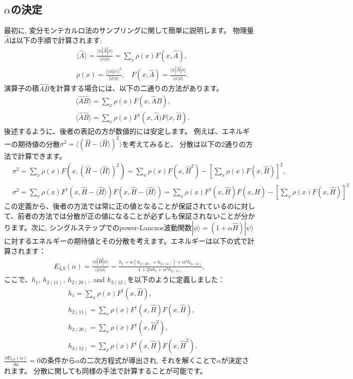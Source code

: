 \subsection{$\alpha$の決定}
最初に, 変分モンテカルロ法のサンプリングに関して簡単に説明します。
物理量$\hat{A}$は以下の手順で計算されます:
\begin{align}
&\langle \hat{A}\rangle = \frac{\langle \phi| \hat{A}|\phi \rangle}{\langle \phi| \phi \rangle} = \sum_{x} \rho(x) F(x, {\hat{A}}),\\
& \rho(x)=\frac{|\langle \phi|x\rangle|^2}{\langle \phi | \phi \rangle}, ~~~~F(x,  {\hat{A}}) =  \frac{\langle x| \hat{A}|\phi \rangle}{\langle x| \phi \rangle}.
\end{align}
演算子の積$\hat{A}\hat{B}$を計算する場合には、以下の二通りの方法があります。
\begin{align}
&\langle \hat{A} \hat{B}\rangle = \sum_{x} \rho(x) F(x, {\hat{A}\hat{B}}),\\
&\langle \hat{A} \hat{B}\rangle = \sum_{x} \rho(x) F^{\dag}(x, {\hat{A})F(x, \hat{B}}).
\end{align}
後述するように、後者の表記の方が数値的には安定します。
例えば、エネルギーの期待値の分散$\sigma^2=\langle (\hat{H}-\langle \hat{H}\rangle)^2\rangle$を考えてみると、
分散は以下の2通りの方法で計算できます。
\begin{align}
&\sigma^2=\sum_{x} \rho(x) F(x,  (\hat{H}-\langle \hat{H}\rangle)^2) = \sum_{x} \rho(x) F(x,  \hat{H}^2) - \left[ \sum_{x} \rho(x) F(x,  \hat{H})\right]^2 ,\\
&\sigma^2=\sum_{x} \rho(x) F^{\dag}(x,  \hat{H}-\langle \hat{H}\rangle)F(x,  \hat{H}-\langle \hat{H}\rangle) = \sum_{x} \rho(x) F^{\dag}(x,  \hat{H}) F(x, \hat{H})- \left[ \sum_{x} \rho(x) F(x,  \hat{H})\right]^2 
\end{align}
この定義から、後者の方法では常に正の値となることが保証されているのに対して、前者の方法では分散が正の値になることが必ずしも保証されないことが分かります。次に, シングルステップでのpower-Lanczos波動関数$|\phi\rangle =(1+\alpha \hat{H}) |\psi \rangle$に対するエネルギーの期待値とその分散を考えます。エネルギーは以下の式で計算されます：
\begin{align}
E_{LS}(\alpha) =\frac{\langle \phi| \hat{H} |\phi\rangle}{\langle \phi|\phi\rangle}=\frac{h_1 + \alpha(h_{2(20)} + h_{2(11)}) + \alpha^2 h_{3(12)}}{1 + 2\alpha h_1 + \alpha^2 h_{2(11)}},
\end{align}
ここで、$h_1$, $h_{2(11)},~h_{2(20)},$ and $h_{3(12)}$を以下のように定義しました：
\begin{align}
&h_1 =\sum_{x} \rho(x) F^{\dag}(x,  \hat{H}),\\
&h_{2(11)}=\sum_{x} \rho(x) F^{\dag}(x,  \hat{H}) F(x, \hat{H}),\\
&h_{2(20)}=\sum_{x} \rho(x) F^{\dag}(x,  \hat{H}^2),\\
&h_{3(12)}=\sum_{x} \rho(x) F^{\dag}(x,  \hat{H})F(x,  \hat{H}^2).
\end{align}
$\frac{\partial E_{LS}(\alpha)}{\partial \alpha}=0$の条件から$\alpha$の二次方程式が導出され, それを解くことで$\alpha$が決定されます。
分散に関しても同様の手法で計算することが可能です。
